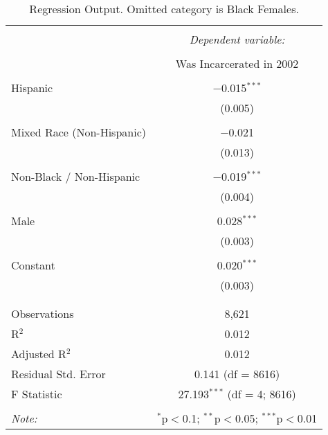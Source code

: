 
\begin{table}[!htbp] \centering 
  \caption{Regression Output. Omitted category is Black Females.} 
  \label{tab:regression} 
\begin{tabular}{@{\extracolsep{5pt}}lc} 
\\[-1.8ex]\hline 
\hline \\[-1.8ex] 
 & \multicolumn{1}{c}{\textit{Dependent variable:}} \\ 
\cline{2-2} 
\\[-1.8ex] & Was Incarcerated in 2002 \\ 
\hline \\[-1.8ex] 
 Hispanic & $-$0.015$^{***}$ \\ 
  & (0.005) \\ 
  & \\ 
 Mixed Race (Non-Hispanic) & $-$0.021 \\ 
  & (0.013) \\ 
  & \\ 
 Non-Black / Non-Hispanic & $-$0.019$^{***}$ \\ 
  & (0.004) \\ 
  & \\ 
 Male & 0.028$^{***}$ \\ 
  & (0.003) \\ 
  & \\ 
 Constant & 0.020$^{***}$ \\ 
  & (0.003) \\ 
  & \\ 
\hline \\[-1.8ex] 
Observations & 8,621 \\ 
R$^{2}$ & 0.012 \\ 
Adjusted R$^{2}$ & 0.012 \\ 
Residual Std. Error & 0.141 (df = 8616) \\ 
F Statistic & 27.193$^{***}$ (df = 4; 8616) \\ 
\hline 
\hline \\[-1.8ex] 
\textit{Note:}  & \multicolumn{1}{r}{$^{*}$p$<$0.1; $^{**}$p$<$0.05; $^{***}$p$<$0.01} \\ 
\end{tabular} 
\end{table} 
